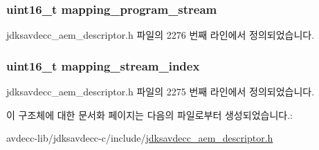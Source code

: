 \subsubsection[{\texorpdfstring{mapping\+\_\+program\+\_\+stream}{mapping_program_stream}}]{\setlength{\rightskip}{0pt plus 5cm}uint16\+\_\+t mapping\+\_\+program\+\_\+stream}\hypertarget{structjdksavdecc__video__mapping_a71a5421044e2dd9e8a1bc1667b0acf84}{}\label{structjdksavdecc__video__mapping_a71a5421044e2dd9e8a1bc1667b0acf84}


jdksavdecc\+\_\+aem\+\_\+descriptor.\+h 파일의 2276 번째 라인에서 정의되었습니다.

\subsubsection[{\texorpdfstring{mapping\+\_\+stream\+\_\+index}{mapping_stream_index}}]{\setlength{\rightskip}{0pt plus 5cm}uint16\+\_\+t mapping\+\_\+stream\+\_\+index}\hypertarget{structjdksavdecc__video__mapping_ae776f05f1f60f83a69c154844271ca4a}{}\label{structjdksavdecc__video__mapping_ae776f05f1f60f83a69c154844271ca4a}


jdksavdecc\+\_\+aem\+\_\+descriptor.\+h 파일의 2275 번째 라인에서 정의되었습니다.



이 구조체에 대한 문서화 페이지는 다음의 파일로부터 생성되었습니다.\+:\begin{DoxyCompactItemize}
\item 
avdecc-\/lib/jdksavdecc-\/c/include/\hyperlink{jdksavdecc__aem__descriptor_8h}{jdksavdecc\+\_\+aem\+\_\+descriptor.\+h}\end{DoxyCompactItemize}

